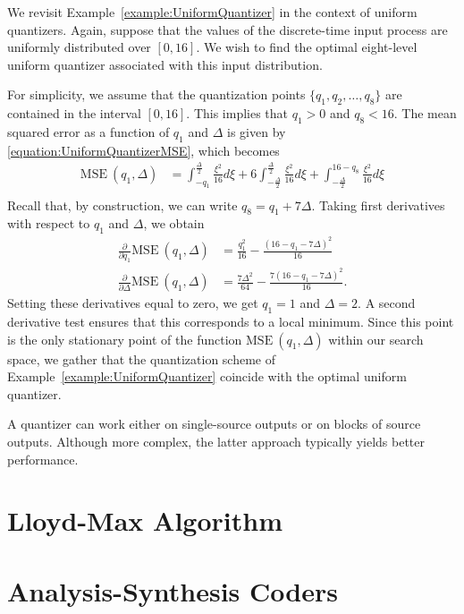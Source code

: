 \begin{example}
We revisit Example~\ref{example:UniformQuantizer} in the context of uniform quantizers.
Again, suppose that the values of the discrete-time input process are uniformly distributed over $[0, 16]$.
We wish to find the optimal eight-level uniform quantizer associated with this input distribution.

For simplicity, we assume that the quantization points $\{ q_1, q_2, \ldots, q_8 \}$ are contained in the interval $[0, 16]$.
This implies that $q_1 > 0$ and $q_8 < 16$.
The mean squared error as a function of $q_1$ and $\Delta$ is given by \eqref{equation:UniformQuantizerMSE}, which becomes
\begin{equation*}
\begin{split}
\text{MSE}~(q_1, \Delta)
&= \int_{-q_1}^{\frac{\Delta}{2}} \frac{\xi^2}{16} d\xi
+ 6 \int_{- \frac{\Delta}{2}}^{\frac{\Delta}{2}} \frac{\xi^2}{16} d\xi
+ \int_{- \frac{\Delta}{2}}^{16 - q_8} \frac{\xi^2}{16} d\xi \\
\end{split}
\end{equation*}
Recall that, by construction, we can write $q_8 = q_1 + 7 \Delta$.
Taking first derivatives with respect to $q_1$ and $\Delta$, we obtain
\begin{align*}
\frac{\partial}{\partial q_1} \text{MSE}~(q_1, \Delta)
&= \frac{q_1^2}{16} - \frac{(16 - q_1 - 7 \Delta)^2}{16} \\
\frac{\partial}{\partial \Delta} \text{MSE}~(q_1, \Delta)
&= \frac{7 \Delta^2}{64} - \frac{7 (16 - q_1 - 7\Delta)^2}{16} .
\end{align*}
Setting these derivatives equal to zero, we get $q_1 = 1$ and $\Delta = 2$.
A second derivative test ensures that this corresponds to a local minimum.
Since this point is the only stationary point of the function $\text{MSE}~(q_1, \Delta)$ within our search space, we gather that the quantization scheme of Example~\ref{example:UniformQuantizer} coincide with the optimal uniform quantizer.
\end{example}





\newpage

A quantizer can work either on single-source outputs or on blocks of source outputs.
Although more complex, the latter approach typically yields better performance.

\section{Lloyd-Max Algorithm}


\section{Analysis-Synthesis Coders}


